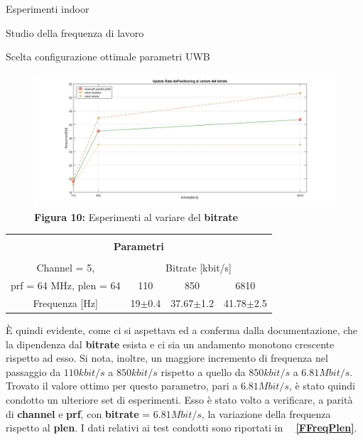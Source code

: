\documentclass[12pt]{report}
\begin{document}
\begin{section}{Esperimenti indoor}
\begin{subsection}{Studio della frequenza di lavoro}
\begin{subsubsection}{Scelta configurazione ottimale parametri UWB}
			\begin{figure}[H]
				\centering
				\includegraphics[scale=0.3]{FreqBit} 	
				\caption{\textbf{Figura 10:} Esperimenti al variare del \textbf{bitrate}\label{FFreqBit}}		
			\end{figure}
			\begin{table}[H]
						\centering
						\begin{tabular}{|c|c|c|c|}
							\hline
							\multicolumn{4}{|c|}{}\\
							\multicolumn{4}{|c|}{\textbf{\Large Parametri}}\\
							\multicolumn{4}{|c|}{}\\
							\hline
							Channel = 5,& \multicolumn{3}{|c|}{Bitrate [kbit/s]}\\
			\cline{2-4}
							 prf = 64 MHz, plen =  64& 110& 850& 6810\\
			\hline
			Frequenza [Hz] & 19$\pm$0.4& 37.67$\pm$1.2& 41.78$\pm$2.5\\
			\hline
							\end{tabular}
			\end{table}
			È quindi evidente, come ci si aspettava ed a conferma dalla documentazione, che la dipendenza dal \textbf{bitrate} esista e ci sia un andamento monotono crescente rispetto ad esso. Si nota, inoltre, un maggiore incremento di frequenza nel passaggio da $110kbit/s$ a $850kbit/s$ rispetto a quello da $850kbit/				s$	a $6.81Mbit/s$.\\
			Trovato il valore ottimo per questo parametro, pari a $6.81Mbit/s$, è stato quindi condotto un ulteriore set di esperimenti. Esso è stato volto a verificare, a parità di \textbf{channel} e \textbf{prf}, con \textbf{bitrate} = $6.81Mbit/s$,  la variazione della frequenza rispetto al \textbf{plen}. I dati relativi ai test 					condotti sono riportati in \textbf{\figurename~ \ref{FFreqPlen}}.


\end{subsubsection}
\end{subsection}
\end{section}
\end{document}
